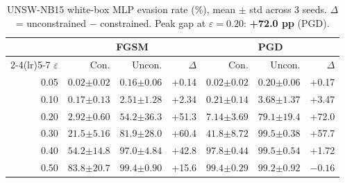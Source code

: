 \documentclass[sigconf,anonymous=true]{acmart}
\newcommand{\gap}[1]{\textcolor{deltagreen}{+#1}}
\begin{document}
\begin{table}[t]
\centering
\caption{UNSW-NB15 white-box MLP evasion rate (\%), mean $\pm$ std
         across 3 seeds.  $\Delta$ = unconstrained $-$ constrained.
         Peak gap at $\varepsilon=0.20$: \textbf{+72.0 pp} (PGD).}
\label{tab:unsw_wb}
\small
\begin{tabular}{r rr r rr r}
\toprule
 & \multicolumn{3}{c}{\textbf{FGSM}} & \multicolumn{3}{c}{\textbf{PGD}} \\
\cmidrule(lr){2-4}\cmidrule(lr){5-7}
$\varepsilon$ & Con. & Uncon. & $\Delta$ & Con. & Uncon. & $\Delta$ \\
\midrule
0.05 & $0.02{\scriptstyle\pm0.02}$ & $0.16{\scriptstyle\pm0.06}$ & \gap{0.14} &
       $0.02{\scriptstyle\pm0.02}$ & $0.20{\scriptstyle\pm0.06}$ & \gap{0.17} \\
0.10 & $0.17{\scriptstyle\pm0.13}$ & $2.51{\scriptstyle\pm1.28}$ & \gap{2.34} &
       $0.21{\scriptstyle\pm0.14}$ & $3.68{\scriptstyle\pm1.37}$ & \gap{3.47} \\
0.20 & $2.92{\scriptstyle\pm0.60}$ & $54.2{\scriptstyle\pm36.3}$ & \gap{51.3} &
       $7.14{\scriptstyle\pm3.69}$ & $79.1{\scriptstyle\pm19.4}$ & \gap{72.0} \\
0.30 & $21.5{\scriptstyle\pm5.16}$ & $81.9{\scriptstyle\pm28.0}$ & \gap{60.4} &
       $41.8{\scriptstyle\pm8.72}$ & $99.5{\scriptstyle\pm0.38}$ & \gap{57.7} \\
0.40 & $54.2{\scriptstyle\pm14.8}$ & $97.0{\scriptstyle\pm4.84}$ & \gap{42.8} &
       $97.8{\scriptstyle\pm0.44}$ & $99.5{\scriptstyle\pm0.54}$ & \gap{1.72} \\
0.50 & $83.8{\scriptstyle\pm20.7}$ & $99.4{\scriptstyle\pm0.90}$ & \gap{15.6} &
       $99.4{\scriptstyle\pm0.29}$ & $99.2{\scriptstyle\pm0.92}$ & $-0.16$ \\
\bottomrule
\end{tabular}
\end{table}
\end{document}
